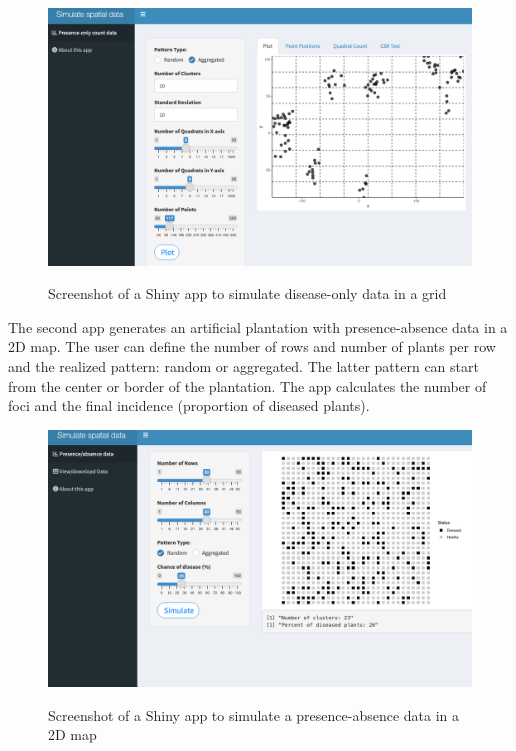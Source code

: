 \documentclass[
  letterpaper,
]{book}
\begin{document}
\begin{figure}

{\centering 

\href{https://delponte.shinyapps.io/spatial/}{\includegraphics[width=5.42708in,height=\textheight]{imgs/spatial_shiny.png}}

}

\caption{\label{fig-spatial1}Screenshot of a Shiny app to simulate
disease-only data in a grid}

\end{figure}

The second app generates an artificial plantation with presence-absence
data in a 2D map. The user can define the number of rows and number of
plants per row and the realized pattern: random or aggregated. The
latter pattern can start from the center or border of the plantation.
The app calculates the number of foci and the final incidence
(proportion of diseased plants).

\begin{figure}

{\centering 

\href{https://delponte.shinyapps.io/spatial2}{\includegraphics[width=5.42708in,height=\textheight]{imgs/spatial2_shiny.png}}

}

\caption{\label{fig-spatial2}Screenshot of a Shiny app to simulate a
presence-absence data in a 2D map}

\end{figure}
\end{document}
